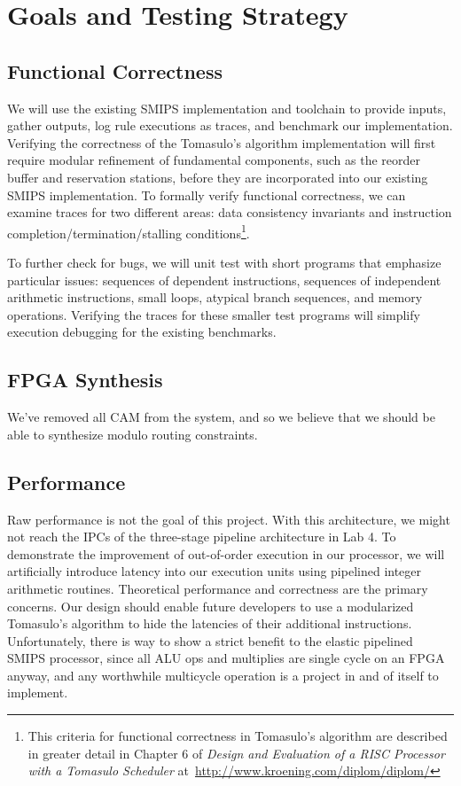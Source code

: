 \documentclass[12pt]{article}
\begin{document}
\section{Goals and Testing Strategy}

\subsection{Functional Correctness}

We will use the existing SMIPS implementation and toolchain to provide inputs,
gather outputs, log rule executions as traces, and benchmark our
implementation. Verifying the correctness of the Tomasulo's algorithm
implementation will first require modular refinement of fundamental
components, such as the reorder buffer and reservation stations, before they
are incorporated into our existing SMIPS implementation. To formally verify
functional correctness, we can examine traces for two different areas: data
consistency invariants and instruction completion/termination/stalling
conditions\footnote{This criteria for functional correctness in Tomasulo's
algorithm are described in greater detail in Chapter 6 of \emph{Design and
Evaluation of a RISC Processor with a Tomasulo Scheduler}
at~\url{http://www.kroening.com/diplom/diplom/}}.

To further check for bugs, we will unit test with short programs that
emphasize particular issues: sequences of dependent instructions, sequences of
independent arithmetic instructions, small loops, atypical branch sequences,
and memory operations. Verifying the traces for these smaller test programs
will simplify execution debugging for the existing benchmarks.

\subsection{FPGA Synthesis} We've removed all CAM from the system, and so we
believe that we should be able to synthesize modulo routing constraints.

\subsection{Performance} Raw performance is not the goal of this project. With
this architecture, we might not reach the IPCs of the three-stage pipeline
architecture in Lab 4. To demonstrate the improvement of out-of-order
execution in our processor, we will artificially introduce latency into our
execution units using pipelined integer arithmetic routines. Theoretical
performance and correctness are the primary concerns. Our design should enable
future developers to use a modularized Tomasulo's algorithm to hide the
latencies of their additional instructions. Unfortunately, there is way to
show a strict benefit to the elastic pipelined SMIPS processor, since all ALU
ops and multiplies are single cycle on an FPGA anyway, and any worthwhile
multicycle operation is a project in and of itself to implement.
\end{document}

